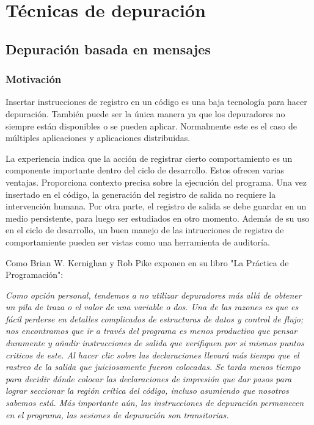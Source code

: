 \documentclass[12pt,legalpaper]{report}
\begin{document}
	\section{Técnicas de depuración}
		\subsection{Depuración basada en mensajes}
			\subsubsection{Motivación}

Insertar instrucciones de registro en un código es una baja tecnología para hacer depuración.  También puede ser la única manera ya que los depuradores no siempre están disponibles o se pueden aplicar. Normalmente este es el caso de múltiples aplicaciones y aplicaciones distribuidas.

La experiencia indica que la acción de registrar cierto comportamiento es un componente importante dentro del ciclo de desarrollo. Estos ofrecen varias ventajas. Proporciona contexto precisa sobre la ejecución del programa. Una vez insertado en el código, la generación del registro de salida no requiere la intervención humana. Por otra parte, el registro de salida se debe guardar en un medio persistente, para luego ser estudiados en otro momento. Además de su uso en el ciclo de desarrollo, un buen manejo de las intrucciones de registro de comportamiente pueden ser vistas como una herramienta de auditoría.

Como Brian W. Kernighan y Rob Pike exponen en su libro "La Práctica de Programación":

\textit{Como opción personal, tendemos a no utilizar depuradores más allá de obtener un pila de traza o el valor de una variable o dos. Una de las razones es que es fácil perderse en detalles complicados de estructuras de datos y control de flujo; nos encontramos que ir a través del programa es menos productivo que pensar duramente y añadir instrucciones de salida que verifiquen por si mismos puntos criticos de este. Al hacer clic sobre las declaraciones llevará más tiempo que el rastreo de la salida que juiciosamente fueron colocadas. Se tarda menos tiempo para decidir dónde colocar las declaraciones de impresión que dar pasos para lograr seccionar la región crítica del código, incluso asumiendo que nosotros sabemos está. Más importante aún, las instrucciones de depuración permanecen en el programa, las sesiones de depuración son transitorias.}
\end{document}
